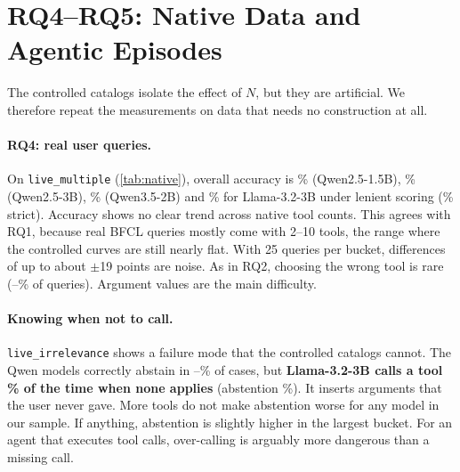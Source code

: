 \section{RQ4--RQ5: Native Data and Agentic Episodes}
\label{sec:native}

The controlled catalogs isolate the effect of $N$, but they are artificial. We therefore repeat the measurements on data that needs no construction at all.

\begin{table}[t]
  \centering
  \caption{Native BFCL data (\%). Left: accuracy on \texttt{live\_multiple}, real user queries with the 2--37 tools that BFCL ships with them, by native tool count (25 queries per bucket); $^\dagger$lenient. Right: abstention rate on \texttt{live\_irrelevance}, where no tool fits and the correct behaviour is to make no call (25 per bucket).}
  \label{tab:native}
  \small
  \setlength{\tabcolsep}{4pt}
  \resizebox{\linewidth}{!}{}
\end{table}

\paragraph{RQ4: real user queries.}
On \texttt{live\_multiple} (\cref{tab:native}), overall accuracy is \NatAccQwenOneFive\% (Qwen2.5-1.5B), \NatAccQwenThree\% (Qwen2.5-3B), \NatAccQwenThreeFive\% (Qwen3.5-2B) and \NatLenLlama\% for Llama-3.2-3B under lenient scoring (\NatAccLlama\% strict).
Accuracy shows no clear trend across native tool counts. This agrees with RQ1, because real BFCL queries mostly come with 2--10 tools, the range where the controlled curves are still nearly flat. With 25 queries per bucket, differences of up to about $\pm$19 points are noise.
As in RQ2, choosing the wrong tool is rare (\NatWrongToolLlama--\NatWrongToolQwenThree\% of queries). Argument values are the main difficulty.

\paragraph{Knowing when not to call.}
\texttt{live\_irrelevance} shows a failure mode that the controlled catalogs cannot.
The Qwen models correctly abstain in \NatAbstQwenThreeFive--\NatAbstQwenOneFive\% of cases, but \textbf{Llama-3.2-3B calls a tool \NatAbstInvLlama\% of the time when none applies} (abstention \NatAbstLlama\%). It inserts arguments that the user never gave.
More tools do not make abstention worse for any model in our sample. If anything, abstention is slightly higher in the largest bucket.
For an agent that executes tool calls, over-calling is arguably more dangerous than a missing call.

